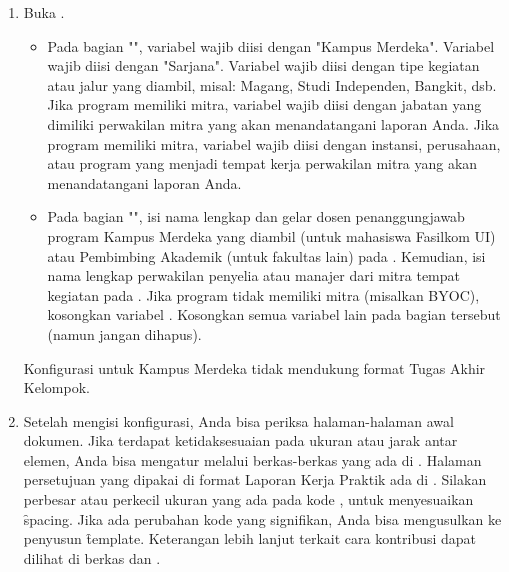 \begin{enumerate}
\item Buka .
\begin{itemize}
	\item Pada bagian "", variabel  wajib diisi dengan "Kampus Merdeka".
	Variabel  wajib diisi dengan "Sarjana".
	Variabel  wajib diisi dengan tipe kegiatan atau jalur yang diambil, misal: Magang, Studi Independen, Bangkit, dsb.
	Jika program memiliki mitra, variabel  wajib diisi dengan jabatan yang dimiliki perwakilan mitra yang akan menandatangani laporan Anda.
	Jika program memiliki mitra, variabel  wajib diisi dengan instansi, perusahaan, atau program yang menjadi tempat kerja perwakilan mitra yang akan menandatangani laporan Anda.
	\item Pada bagian "", isi nama lengkap dan gelar dosen penanggungjawab program Kampus Merdeka yang diambil (untuk mahasiswa Fasilkom UI) atau Pembimbing Akademik (untuk fakultas lain) pada .
	Kemudian, isi nama lengkap perwakilan penyelia atau manajer dari mitra tempat kegiatan pada .
	Jika program tidak memiliki mitra (misalkan BYOC), kosongkan variabel .
	Kosongkan semua variabel lain pada bagian tersebut (namun jangan dihapus).
\end{itemize}
Konfigurasi untuk Kampus Merdeka tidak mendukung format Tugas Akhir Kelompok.
\item Setelah mengisi konfigurasi, Anda bisa periksa halaman-halaman awal dokumen. Jika terdapat ketidaksesuaian pada ukuran atau jarak antar elemen, Anda bisa mengatur melalui berkas-berkas yang ada di .
Halaman persetujuan yang dipakai di format Laporan Kerja Praktik ada di .
Silakan perbesar atau perkecil ukuran yang ada pada kode , untuk menyesuaikan \f{spacing}.
Jika ada perubahan kode yang signifikan, Anda bisa mengusulkan ke penyusun \f{template}.
Keterangan lebih lanjut terkait cara kontribusi dapat dilihat di berkas  dan .
\end{enumerate}
